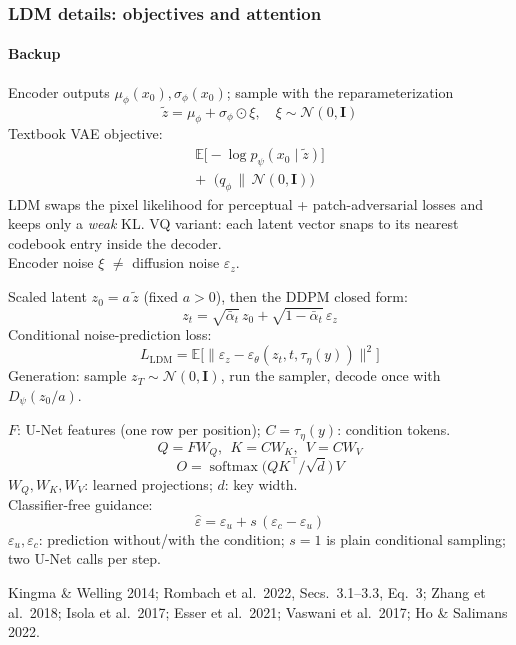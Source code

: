 \documentclass[aspectratio=169,9pt,xcolor=table]{beamer}
\newcommand{\E}{\mathbb{E}}
\newcommand{\Normal}{\mathcal{N}}
\newcommand{\Id}{\mathbf{I}}
\newcommand{\eps}{\varepsilon}
\newcommand{\ab}{\bar{\alpha}}
\DeclareMathOperator{\softmax}{softmax}
\DeclareMathOperator{\KL}{D_{KL}}
\newcommand{\src}[1]{\par\vfill{\color{muted}\fontsize{6.2}{7.4}\selectfont #1\par}}
\begin{document}
\begin{frame}
\frametitle{LDM details: objectives and attention}
\framesubtitle{Backup}
\begin{tcbraster}[raster columns=3,raster equal height,raster column skip=2.5mm,raster before skip=0pt,raster after skip=0pt,
  raster every box/.style={base,fontupper=\scriptsize,coltitle=white}]
\begin{tcolorbox}[colframe=ok,colback=ok!5!white,title={Stage 1: autoencoder (KL variant)}]
\setlength{\abovedisplayskip}{2pt}\setlength{\belowdisplayskip}{2pt}
Encoder outputs $\mu_\phi(x_0),\sigma_\phi(x_0)$; sample with the reparameterization
\[\tilde z=\mu_\phi+\sigma_\phi\odot\xi,\quad \xi\sim\Normal(0,\Id)\]
Textbook VAE objective:
\[\begin{gathered}\E\big[-\log p_\psi(x_0\mid\tilde z)\big]\\+\KL\big(q_\phi\,\|\,\Normal(0,\Id)\big)\end{gathered}\]
LDM swaps the pixel likelihood for perceptual + patch-adversarial losses and keeps only a \emph{weak} KL. VQ variant: each latent vector snaps to its nearest codebook entry inside the decoder.\\[0.6mm]
Encoder noise $\xi$ $\neq$ diffusion noise $\eps_z$.
\end{tcolorbox}
\begin{tcolorbox}[colframe=hcmusblue,colback=hcmusblue!5!white,title={Stage 2: diffusion on latents}]
\setlength{\abovedisplayskip}{2pt}\setlength{\belowdisplayskip}{2pt}
Scaled latent $z_0=a\,\tilde z$ (fixed $a>0$), then the DDPM closed form:
\[z_t=\sqrt{\ab_t}\,z_0+\sqrt{1-\ab_t}\,\eps_z\]
Conditional noise-prediction loss:
\[L_{\text{LDM}}=\E\big[\|\eps_z-\eps_\theta(z_t,t,\tau_\eta(y))\|^2\big]\]
Generation: sample $z_T\sim\Normal(0,\Id)$, run the sampler, decode once with $D_\psi(z_0/a)$.
\end{tcolorbox}
\begin{tcolorbox}[colframe=fwd,colback=fwd!5!white,title={Cross-attention and guidance}]
\setlength{\abovedisplayskip}{2pt}\setlength{\belowdisplayskip}{2pt}
$F$: U-Net features (one row per position); $C=\tau_\eta(y)$: condition tokens.
\[Q=FW_Q,\ \ K=CW_K,\ \ V=CW_V\]
\[O=\softmax\big(QK^{\top}/\sqrt{d}\big)\,V\]
$W_Q,W_K,W_V$: learned projections; $d$: key width.\\[0.6mm]
Classifier-free guidance:
\[\hat\eps=\eps_u+s\,(\eps_c-\eps_u)\]
$\eps_u,\eps_c$: prediction without/with the condition; $s=1$ is plain conditional sampling; two U-Net calls per step.
\end{tcolorbox}
\end{tcbraster}
\src{Kingma \& Welling 2014; Rombach et al.\ 2022, Secs.~3.1--3.3, Eq.~3; Zhang et al.\ 2018; Isola et al.\ 2017; Esser et al.\ 2021; Vaswani et al.\ 2017; Ho \& Salimans 2022.}
\end{frame}
\end{document}
